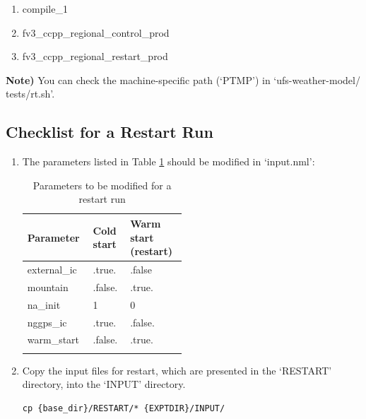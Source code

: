 \documentclass[11pt,fleqn]{report}              %
\begin{document}
\begin{enumerate}
\item compile\_1
\item fv3\_ccpp\_regional\_control\_prod
\item fv3\_ccpp\_regional\_restart\_prod
\end{enumerate}
{\bf Note)} You can check the machine-specific path (`PTMP') in `ufs-weather-model/ tests/rt.sh'.



\subsection{Checklist for a Restart Run}

\begin{enumerate}
\item The parameters listed in Table \ref{table:param_modify_restart} should be modified in `input.nml':
{
\fontsize{10}{12}\selectfont
\begin{longtable}{p{0.15\linewidth} | p{0.12\linewidth} | p{0.2\linewidth} }
\hline
\hline
 Parameter & Cold start & Warm start (restart) \\
\hline
 external\_ic & .true. & .false \\
 mountain & .false. & .true. \\
 na\_init & 1 & 0 \\
 nggps\_ic & .true. & .false. \\
 warm\_start & .false. & .true. \\ 
\hline
\caption{Parameters to be modified for a restart run}
\label{table:param_modify_restart}
\end{longtable}
}

\item Copy the input files for restart, which are presented in the `RESTART' directory, into the `INPUT' directory. 
\lstset{language=bash}   
\begin{lstlisting}[frame=trBL]
cp {base_dir}/RESTART/* {EXPTDIR}/INPUT/
\end{lstlisting}


\end{enumerate}
\end{document}

